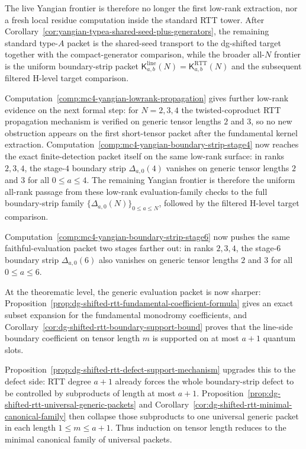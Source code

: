 \begin{remark}
\begin{remark}
The live Yangian frontier is therefore no longer the
first low-rank extraction, nor a fresh local residue computation inside
the standard RTT tower.  After
Corollary~\ref{cor:yangian-typea-shared-seed-plus-generators}, the
remaining standard type-$A$ packet is the shared-seed transport to the
dg-shifted target together with the compact-generator comparison, while
the broader all-$N$ frontier is the uniform boundary-strip packet
\(\mathsf{K}^{\mathrm{line}}_{a,b}(N)
=
\mathsf{K}^{\mathrm{RTT}}_{a,b}(N)\)
and the subsequent filtered H-level target comparison.

Computation~\ref{comp:mc4-yangian-lowrank-propagation} gives further
low-rank evidence on the next formal step: for $N=2,3,4$ the
twisted-coproduct RTT propagation mechanism is verified on generic
tensor lengths $2$ and $3$, so no new obstruction appears on the first
short-tensor packet after the fundamental kernel extraction.
Computation~\ref{comp:mc4-yangian-boundary-strip-stage4} now reaches the
exact finite-detection packet itself on the same low-rank surface: in
ranks $2,3,4$, the stage-$4$ boundary strip
$\Delta_{a,0}(4)$ vanishes on generic tensor lengths $2$ and $3$ for
all $0\le a\le 4$.  The remaining Yangian frontier is therefore the
uniform all-rank passage from these low-rank evaluation-family checks
to the full boundary-strip family $\{\Delta_{a,0}(N)\}_{0\le a\le N}$,
followed by the filtered H-level target comparison.

Computation~\ref{comp:mc4-yangian-boundary-strip-stage6} now pushes the
same faithful-evaluation packet two stages farther out: in ranks
$2,3,4$, the stage-$6$ boundary strip $\Delta_{a,0}(6)$ also vanishes
on generic tensor lengths $2$ and $3$ for all $0\le a\le 6$.

At the theorematic level, the generic evaluation packet is now sharper:
Proposition~\ref{prop:dg-shifted-rtt-fundamental-coefficient-formula}
gives an exact subset expansion for the fundamental monodromy
coefficients, and
Corollary~\ref{cor:dg-shifted-rtt-boundary-support-bound} proves that
the line-side boundary coefficient on tensor length $m$ is supported on
at most $a+1$ quantum slots.

Proposition~\ref{prop:dg-shifted-rtt-defect-support-mechanism} upgrades
this to the defect side: RTT degree $a+1$ already forces the whole
boundary-strip defect to be controlled by subproducts of length at most
$a+1$.  Proposition~\ref{prop:dg-shifted-rtt-universal-generic-packets}
and Corollary~\ref{cor:dg-shifted-rtt-minimal-canonical-family} then
collapse those subproducts to one universal generic packet in each
length $1\le m\le a+1$.  Thus induction on tensor length reduces to the minimal canonical
family of universal packets.


\end{remark}
\end{remark}
